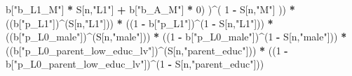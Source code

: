 \documentclass[
]{book}
\newenvironment{Shaded}{\begin{snugshade}}{\end{snugshade}}
\newcommand{\DecValTok}[1]{\textcolor[rgb]{0.00,0.00,0.81}{#1}}
\newcommand{\NormalTok}[1]{#1}
\newcommand{\SpecialCharTok}[1]{\textcolor[rgb]{0.81,0.36,0.00}{\textbf{#1}}}
\newcommand{\StringTok}[1]{\textcolor[rgb]{0.31,0.60,0.02}{#1}}
\begin{document}
\begin{Shaded}
\begin{Highlighting}[]
\NormalTok{              b[}\StringTok{"b\_L1\_M"}\NormalTok{] }\SpecialCharTok{*}\NormalTok{ S[n,}\StringTok{"L1"}\NormalTok{] }\SpecialCharTok{+}
\NormalTok{              b[}\StringTok{"b\_A\_M"}\NormalTok{] }\SpecialCharTok{*} \DecValTok{0}\NormalTok{) )}\SpecialCharTok{\^{}}\NormalTok{( }\DecValTok{1} \SpecialCharTok{{-}}\NormalTok{ S[n,}\StringTok{"M"}\NormalTok{] ))  }\SpecialCharTok{*}
\NormalTok{    ((b[}\StringTok{"p\_L1"}\NormalTok{])}\SpecialCharTok{\^{}}\NormalTok{(S[n,}\StringTok{"L1"}\NormalTok{])) }\SpecialCharTok{*}
\NormalTok{    ((}\DecValTok{1} \SpecialCharTok{{-}}\NormalTok{ b[}\StringTok{"p\_L1"}\NormalTok{])}\SpecialCharTok{\^{}}\NormalTok{(}\DecValTok{1} \SpecialCharTok{{-}}\NormalTok{ S[n,}\StringTok{"L1"}\NormalTok{])) }\SpecialCharTok{*}
\NormalTok{    ((b[}\StringTok{"p\_L0\_male"}\NormalTok{])}\SpecialCharTok{\^{}}\NormalTok{(S[n,}\StringTok{"male"}\NormalTok{])) }\SpecialCharTok{*} 
\NormalTok{    ((}\DecValTok{1} \SpecialCharTok{{-}}\NormalTok{ b[}\StringTok{"p\_L0\_male"}\NormalTok{])}\SpecialCharTok{\^{}}\NormalTok{(}\DecValTok{1} \SpecialCharTok{{-}}\NormalTok{ S[n,}\StringTok{"male"}\NormalTok{])) }\SpecialCharTok{*} 
\NormalTok{    ((b[}\StringTok{"p\_L0\_parent\_low\_educ\_lv"}\NormalTok{])}\SpecialCharTok{\^{}}\NormalTok{(S[n,}\StringTok{"parent\_educ"}\NormalTok{])) }\SpecialCharTok{*}
\NormalTok{    ((}\DecValTok{1} \SpecialCharTok{{-}}\NormalTok{ b[}\StringTok{"p\_L0\_parent\_low\_educ\_lv"}\NormalTok{])}\SpecialCharTok{\^{}}\NormalTok{(}\DecValTok{1} \SpecialCharTok{{-}}\NormalTok{ S[n,}\StringTok{"parent\_educ"}\NormalTok{])) }
    

\end{Highlighting}
\end{Shaded}
\end{document}
